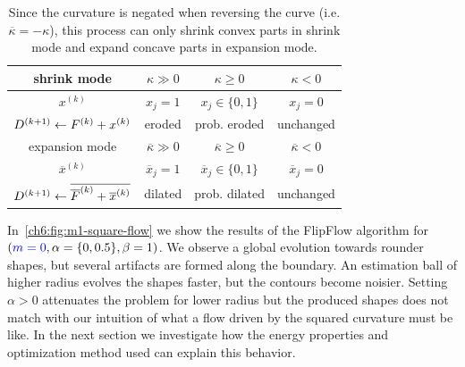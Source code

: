 %
%
\begin{table}
  \center
  \setlength{\extrarowheight}{0.75em}
  \begin{tabular}{|c|c|c|c|} \hline
    shrink mode &    $\kappa \gg 0$ & $\kappa \geq 0$ &  $\kappa < 0$ \\ \hline
    $x^{(k)}$ & $x_j=1$ & $x_j \in \{0,1\}$ & $x_j=0$ \\ \hline
    $D^{(k+1)} \leftarrow F^{(k)} + x^{(k)}$ & eroded & prob. eroded & unchanged  \\ \hline \hline
    expansion mode &    $\overline{\kappa} \gg 0$ & $\overline{\kappa} \geq 0$ & $\overline{\kappa} < 0$ \\ \hline
    $\overline{x}^{(k)}$ & $\overline{x}_j=1$ & $\overline{x}_j \in \{0,1\}$ & $\overline{x}_j=0$ \\ \hline
    $D^{(k+1)} \leftarrow \overline{\overline{F}^{(k)} + \overline{x}^{(k)}}$ & dilated & prob. dilated & unchanged \\ \hline 
  \end{tabular}
  
  \caption{  Since the curvature is negated when reversing the curve (i.e. $\overline{\kappa}=-\kappa$), this process can only shrink  convex parts in shrink mode and expand concave parts in expansion mode.}
   \label{tab:flow-summary}	  

\end{table}


In~\cref{ch6:fig:m1-square-flow} we show the results of the FlipFlow algorithm for $( {\color{blue}{m=0}}, \alpha=\{0, 0.5\}, \beta=1 )$. We observe a global evolution towards rounder shapes, but several artifacts are formed along the boundary. An estimation ball of higher radius evolves the shapes faster, but the contours become noisier. Setting $\alpha >0$ attenuates the problem for lower radius but the produced shapes does not match with our intuition of what a flow driven by the squared curvature must be like. In the next section we investigate how the energy properties and optimization method used can explain this behavior.

